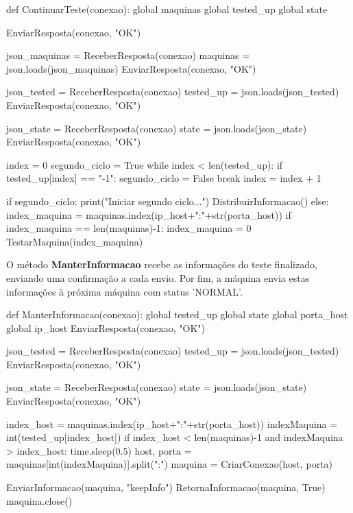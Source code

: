 \vspace*{1cm}
\begin{python}
def ContinuarTeste(conexao):
    global maquinas
    global tested_up
    global state

    EnviarResposta(conexao, "OK")

    json_maquinas = ReceberResposta(conexao)
    maquinas = json.loads(json_maquinas)
    EnviarResposta(conexao, "OK")

    json_tested = ReceberResposta(conexao)
    tested_up = json.loads(json_tested)
    EnviarResposta(conexao, "OK")

    json_state = ReceberResposta(conexao)
    state = json.loads(json_state)
    EnviarResposta(conexao, "OK")

    index = 0
    segundo_ciclo = True
    while index < len(tested_up):
        if tested_up[index] == "-1":
            segundo_ciclo = False
            break
        index = index + 1

    if segundo_ciclo:
        print("Iniciar segundo ciclo...")
        DistribuirInformacao()
    else:
        index_maquina = maquinas.index(ip_host+":"+str(porta_host))
        if index_maquina == len(maquinas)-1:
            index_maquina = 0
        TestarMaquina(index_maquina)
\end{python}
\vspace*{1cm}

O método \textbf{ManterInformacao} recebe as informações do teste finalizado, enviando uma confirmação a cada envio. Por fim, a máquina envia estas informações à próxima máquina com status 
'NORMAL'.

\vspace*{1cm}
\begin{python}
def ManterInformacao(conexao):
    global tested_up
    global state
    global porta_host
    global ip_host
    EnviarResposta(conexao, "OK")

    json_tested = ReceberResposta(conexao)
    tested_up = json.loads(json_tested)
    EnviarResposta(conexao, "OK")

    json_state = ReceberResposta(conexao)
    state = json.loads(json_state)
    EnviarResposta(conexao, "OK")

    index_host = maquinas.index(ip_host+":"+str(porta_host))
    indexMaquina = int(tested_up[index_host])
    if index_host < len(maquinas)-1 and indexMaquina > index_host:
        time.sleep(0.5)
        host, porta = maquinas[int(indexMaquina)].split(":")
        maquina = CriarConexao(host, porta)

        EnviarInformacao(maquina, "keepInfo")
        RetornaInformacao(maquina, True)
        maquina.close()
\end{python}
\vspace*{1cm}

